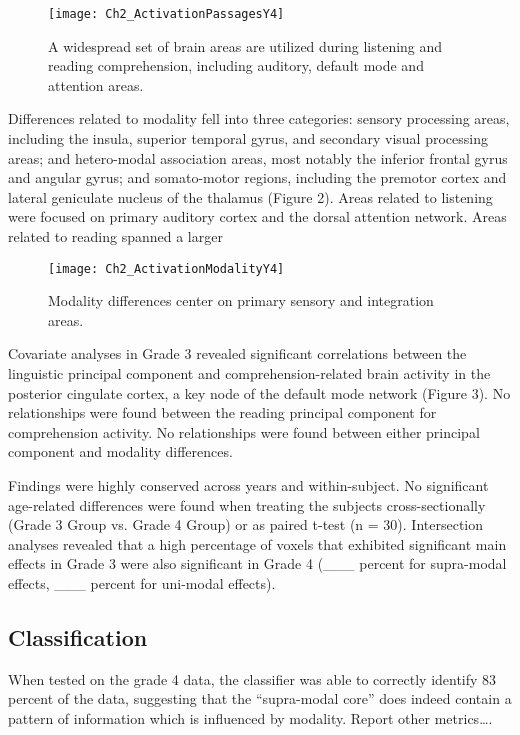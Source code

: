 \begin{figure}[tp]
\centering
\texttt{[image: Ch2\_ActivationPassagesY4]}
    \caption[Language comprehension spans many brain areas.]{A widespread set of brain areas are utilized during listening and reading comprehension, including auditory, default mode and attention areas.}
\label{fig:ch2_passages}
\end{figure}

Differences related to modality fell into three categories: sensory processing areas, including the insula, superior temporal gyrus, and secondary visual processing areas; and hetero-modal association areas, most notably the inferior frontal gyrus and angular gyrus; and somato-motor regions, including the premotor cortex and lateral geniculate nucleus of the thalamus (Figure 2). Areas related to listening were focused on primary auditory cortex and the dorsal attention network. Areas related to reading spanned a larger 

\begin{figure}[!b]
\centering
\texttt{[image: Ch2\_ActivationModalityY4]}
    \caption[Modality differences center on primary sensory and integration areas.]{Modality differences center on primary sensory and integration areas.}
\label{fig:ch2_modality}
\end{figure}

Covariate analyses in Grade 3 revealed significant correlations between the linguistic principal component and comprehension-related brain activity in the posterior cingulate cortex, a key node of the default mode network (Figure 3). No relationships were found between the reading principal component for comprehension activity. No relationships were found between either principal component and modality differences.

Findings were highly conserved across years and within-subject. No significant age-related differences were found when treating the subjects cross-sectionally (Grade 3 Group vs. Grade 4 Group) or as paired t-test (n = 30). Intersection analyses revealed that a high percentage of voxels that exhibited significant main effects in Grade 3 were also significant in Grade 4 (___ percent for supra-modal effects, ___ percent for uni-modal effects).

\subsection{Classification}
When tested on the grade 4 data, the classifier was able to correctly identify 83 percent of the data, suggesting that the “supra-modal core” does indeed contain a pattern of information which is influenced by modality. Report other metrics….

